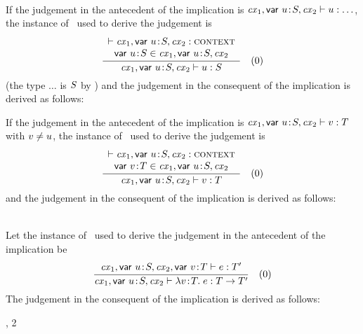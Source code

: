 \begin{bycase}

\Case{\Revar}\\
If the judgement in the antecedent of the implication is
$\mathit{cx}_1,\mathsf{var}\ u\!:\!S,\mathit{cx}_2\vdash u:\ldots$, the instance of \Revar\ used to derive the judgement
is
\[
\rruleII
 {\cxwf{\cxv}}
 {\vdec{\varI}{\typI}\in\cxv}
 {\hasty{\cxv}{\varI}{\typI}}
 {0}
\]
(the type $\ldots$ is $S$ by ) and the judgement
in the consequent of the implication is derived as follows:
\begin{derivation}
\end{derivation}

If the judgement in the antecedent of the implication is
$\mathit{cx}_1,\mathsf{var}\ u\!:\!S,\mathit{cx}_2\vdash v:T$ with $\var\neq\varI$, the instance of \Revar\ used
to derive the judgement is
\[
\rruleII
 {\cxwf{\cxv}}
 {\vdecO\in\cxv}
 {\hasty{\cxv}{\var}{\typ}}
 {0}
\]
and the judgement in the consequent of the implication is derived as follows:
\begin{derivation}
\step{\esbsren{\var}=\var}{\hyp\ $\var\neq\varI$}
\end{derivation}

\Case{\Reabs}\\
Let the instance of \Reabs\ used to derive the judgement in the antecedent of
the implication be
\[
\rruleI
 {\hasty{\snoc{\cxv}{\vdecO}}{\expr}{\typ'}}
 {\hasty{\cxv}{\absO}{\tarr{\typ}{\typ'}}}
 {0}
\]
The judgement in the consequent of the implication is derived as follows:
\begin{derivation}
     {\Reabs, 2}
\end{derivation}


\end{bycase}
